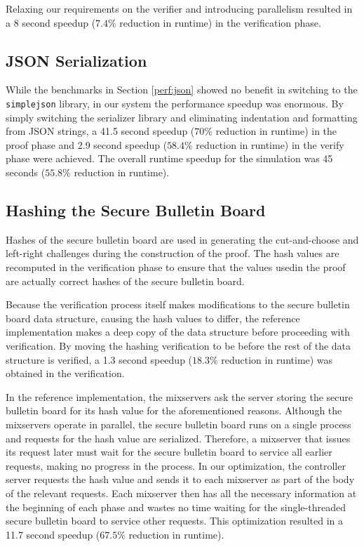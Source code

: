 Relaxing our requirements on the verifier and introducing parallelism resulted in a 8 second speedup ($7.4\%$ reduction in runtime) in the verification phase.

\subsection{JSON Serialization} \label{perf:optimizations:json}

While the benchmarks in Section \ref{perf:json} showed no benefit in switching to the \texttt{simplejson} library, in our system the performance speedup was enormous. By simply switching the serializer library and eliminating indentation and formatting from JSON strings, a 41.5 second speedup ($70\%$ reduction in runtime) in the proof phase and 2.9 second speedup ($58.4\%$ reduction in runtime) in the verify phase were achieved. The overall runtime speedup for the simulation was 45 seconds ($55.8\%$ reduction in runtime).

\subsection{Hashing the Secure Bulletin Board} \label{perf:optimizations:sbb}

Hashes of the secure bulletin board are used in generating the cut-and-choose and left-right challenges during the construction of the proof. The hash values are recomputed in the verification phase to ensure that the values usedin the proof are actually correct hashes of the secure bulletin board.

Because the verification process itself makes modifications to the secure bulletin board data structure, causing the hash values to differ, the reference implementation makes a deep copy of the data structure before proceeding with verification. By moving the hashing verification to be before the rest of the data structure is verified, a 1.3 second speedup ($18.3\%$ reduction in runtime) was obtained in the verification.

In the reference implementation, the mixservers ask the server storing the secure bulletin board for its hash value for the aforementioned reasons. Although the mixservers operate in parallel, the secure bulletin board runs on a single process and requests for the hash value are serialized. Therefore, a mixserver that issues its request later must wait for the secure bulletin board to service all earlier requests, making no progress in the process. In our optimization, the controller server requests the hash value and sends it to each mixserver as part of the body of the relevant requests. Each mixserver then has all the necessary information at the beginning of each phase and wastes no time waiting for the single-threaded secure bulletin board to service other requests. This optimization resulted in a 11.7 second speedup ($67.5\%$ reduction in runtime).

